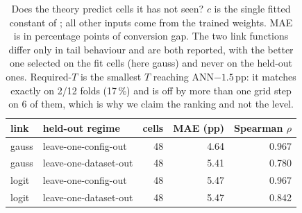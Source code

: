 \begin{table}[t]
\centering
\footnotesize
\caption{Does the theory predict cells it has not seen? $c$ is the single fitted constant of
; all other inputs come from the trained weights. MAE is in percentage points of
conversion gap. The two link functions differ only in tail behaviour and are both reported, with the
better one selected on the fit cells (here gauss) and never on the
held-out ones. Required-$T$ is the smallest $T$ reaching ANN$-1.5$\,pp: it matches exactly on
2/12 folds (17\,\%) and is off by more than one grid step on 6 of them, which is why we claim the ranking and
not the level.}
\label{tab:predict}
\begin{tabular}{llrrr}
\toprule
link & held-out regime & cells & MAE (pp) & Spearman $\rho$ \\
\midrule
gauss & leave-one-config-out & 48 & 4.64 & 0.967 \\
gauss & leave-one-dataset-out & 48 & 5.41 & 0.780 \\
logit & leave-one-config-out & 48 & 5.47 & 0.967 \\
logit & leave-one-dataset-out & 48 & 5.47 & 0.842 \\
\bottomrule
\end{tabular}
\end{table}
